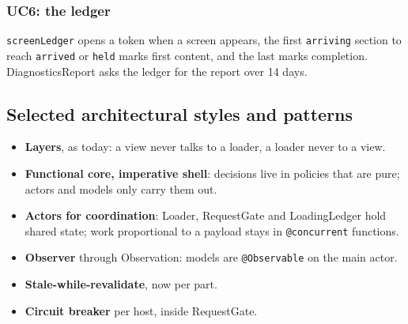 \subsubsection{UC6: the ledger}
\texttt{screenLedger} opens a token when a screen appears, the first \texttt{arriving}
section to reach \texttt{arrived} or \texttt{held} marks first content, and the
last marks completion. DiagnosticsReport asks the ledger for the report over 14
days.

\subsection{Selected architectural styles and patterns}
\begin{itemize}
  \item \textbf{Layers}, as today: a view never talks to a loader, a loader never to a view.
  \item \textbf{Functional core, imperative shell}: decisions live in policies that are pure; actors and models only carry them out.
  \item \textbf{Actors for coordination}: Loader, RequestGate and LoadingLedger hold shared state; work proportional to a payload stays in \texttt{@concurrent} functions.
  \item \textbf{Observer} through Observation: models are \texttt{@Observable} on the main actor.
  \item \textbf{Stale-while-revalidate}, now per part.
  \item \textbf{Circuit breaker} per host, inside RequestGate.
\end{itemize}

